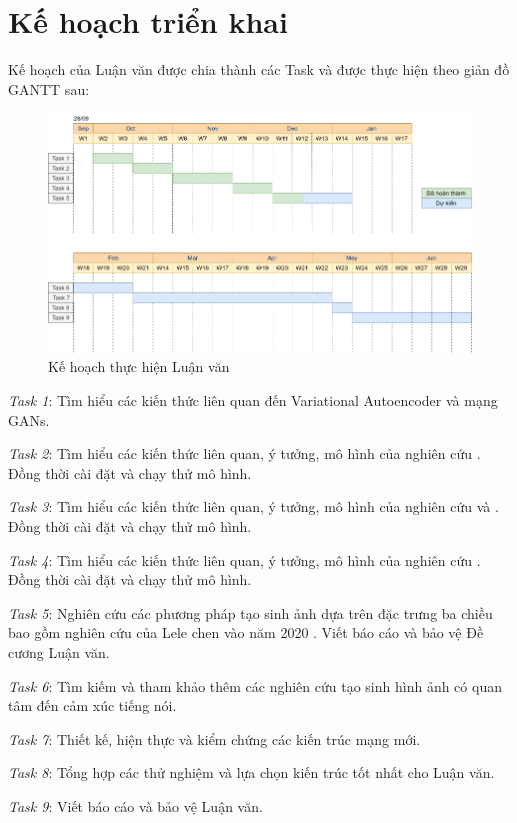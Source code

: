 \section{\texorpdfstring{Kế hoạch triển khai}{Plan}}

Kế hoạch của Luận văn được chia thành các Task và được thực hiện theo giản đồ GANTT sau:

\begin{figure}[H]
    \centering
    \includegraphics[width=15cm]{./content/images/gantt_chart.png}
    \caption{Kế hoạch thực hiện Luận văn}
    \label{fig:gantt_schedule}
\end{figure}

\textit{Task 1}: Tìm hiểu các kiến thức liên quan đến Variational Autoencoder và mạng GANs.

\textit{Task 2}: Tìm hiểu các kiến thức liên quan, ý tưởng, mô hình của nghiên cứu \cite{chen2018}. Đồng thời cài đặt và chạy thử mô hình.

\textit{Task 3}: Tìm hiểu các kiến thức liên quan, ý tưởng, mô hình của nghiên cứu \cite{vougioukas2019} và \cite{vougioukas2020}. Đồng thời cài đặt và chạy thử mô hình.

\textit{Task 4}: Tìm hiểu các kiến thức liên quan, ý tưởng, mô hình của nghiên cứu \cite{chen2019}. Đồng thời cài đặt và chạy thử mô hình.

\textit{Task 5}: Nghiên cứu các phương pháp tạo sinh ảnh dựa trên đặc trưng ba chiều bao gồm nghiên cứu của Lele chen vào năm 2020 \cite{chen2020}. Viết báo cáo và bảo vệ Đề cương Luận văn.

\textit{Task 6}: Tìm kiếm và tham khảo thêm các nghiên cứu tạo sinh hình ảnh có quan tâm đến cảm xúc tiếng nói.

\textit{Task 7}: Thiết kế, hiện thực và kiểm chứng các kiến trúc mạng mới.

\textit{Task 8}: Tổng hợp các thử nghiệm và lựa chọn kiến trúc tốt nhất cho Luận văn.

\textit{Task 9}: Viết báo cáo và bảo vệ Luận văn.
